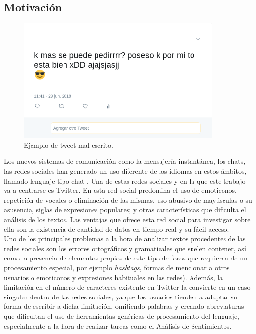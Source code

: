 \documentclass[spanish,12pt, a4paper,twoside]{paper}
\begin{document}
\subsection{Motivación}\label{sec:motivacion}
\begin{figure}[h]
\begin{center}
 \includegraphics[width=0.9\textwidth]{recursos/TweetBad.png}
\caption{Ejemplo de tweet mal escrito.}
\label{fig:tweetbad}
\end{center}
\end{figure}

Los nuevos sistemas de comunicación como la mensajería instantánea, los chats, las redes sociales han generado un uso diferente de los idiomas en estos ámbitos, llamado lenguaje tipo chat \cite{forsyth:2007}. Una de estas redes sociales y en la que este trabajo va a centrarse es Twitter. En esta red social predomina el uso de emoticonos, repetición de vocales o eliminación de las mismas, uso abusivo de mayúsculas o su asusencia, siglas de expresiones populares; y otras características que dificulta el análisis de los textos. Las ventajas que ofrece esta red social para investigar sobre ella son la existencia  de cantidad de datos en tiempo real y su fácil acceso.\\

Uno de los principales problemas a la hora de analizar textos procedentes de las redes sociales son los errores ortográficos y gramaticales que suelen contener, así como la presencia de elementos propios de este tipo de foros que requieren de un procesamiento especial, por ejemplo \textit{hashtags}, formas de mencionar a otros usuarios o emoticonos y expresiones habituales en las redes). Además, la limitación en el número de caracteres existente en Twitter la convierte en un caso singular dentro de las redes sociales, ya que los usuarios tienden a adaptar su forma de escribir a dicha limitación, omitiendo palabras y creando abreviaturas que dificultan el uso de herramientas genéricas de procesamiento del lenguaje, especialmente a la hora de realizar tareas como el Análisis de Sentimientos.\\
\end{document}
